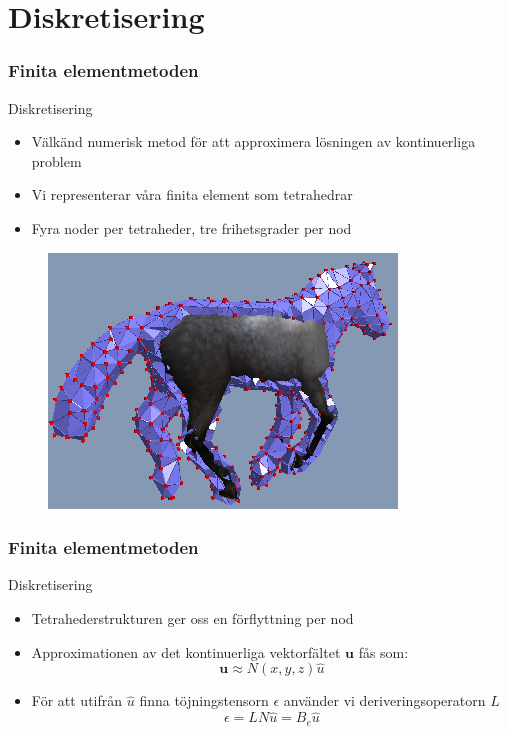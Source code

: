\documentclass{beamer}
\begin{document}
\section{Diskretisering}
\begin{frame}
\frametitle{Finita elementmetoden}
\begin{block}{Diskretisering}
\begin{itemize}
\item Välkänd numerisk metod för att approximera lösningen av kontinuerliga problem
\item Vi representerar våra finita element som tetrahedrar
\item Fyra noder per tetraheder, tre frihetsgrader per nod
\end{itemize}
\begin{figure}
\includegraphics[scale=0.5]{hest.png}
\end{figure}
\end{block}
\end{frame}

\begin{frame}
\frametitle{Finita elementmetoden}
\begin{block}{Diskretisering}
\begin{itemize}
\item Tetrahederstrukturen ger oss en förflyttning per nod
\item Approximationen av det kontinuerliga vektorfältet $\mathbf{u}$ fås som:
	\begin{equation}
		\mathbf{u} \approx N(x,y,z) \hat{u}
	\end{equation}
\item För att utifrån $\hat{u}$ finna töjningstensorn $\epsilon$ använder vi deriveringsoperatorn $L$
	\begin{equation}\label{tio}
    	\epsilon = LN \hat{u} = B_ {e} \hat{u}
	\end{equation}	
\end{itemize}
\end{block}
\end{frame}
\end{document}
